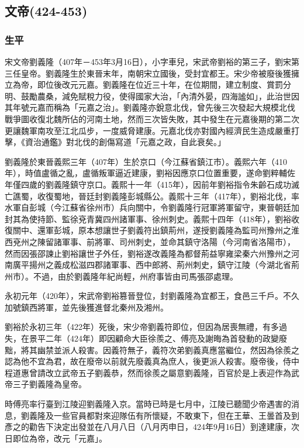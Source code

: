 
\subsection{文帝\tiny(424-453)}

\subsubsection{生平}

宋文帝劉義隆（407年－453年3月16日），小字車兒，宋武帝劉裕的第三子，劉宋第三任皇帝。劉義隆生於東晉末年，南朝宋立國後，受封宜都王。宋少帝被廢後獲擁立為帝，即位後改元元嘉。劉義隆在位近三十年，在位期間，建立制度、賞罰分明、鼓勵農桑，減免賦稅力役，使得國家大治，「內清外晏，四海謐如」，此治世因其年號元嘉而稱為「元嘉之治」。劉義隆亦銳意北伐，曾先後三次發起大規模北伐戰爭圖收復北魏所佔的河南土地，然而三次皆失敗，其中發生在元嘉後期的第二次更讓魏軍南攻至江北瓜步，一度威脅建康。元嘉北伐亦對國內經濟民生造成嚴重打擊，《資治通鑑》對北伐的創傷寫道「元嘉之政，自此衰矣。」

劉義隆於東晉義熙三年（407年）生於京口（今江蘇省鎮江市）。義熙六年（410年），時值盧循之亂，盧循叛軍逼近建康，劉裕因應京口位置重要，遂命劉粹輔佐年僅四歲的劉義隆鎮守京口。義熙十一年（415年），因前年劉裕指令朱齡石成功滅亡譙蜀，收復蜀地，晉廷封劉義隆彭城縣公。義熙十三年（417年），劉裕北伐，率水軍自彭城（今江蘇省徐州市）兵向關中，令劉義隆行冠軍將軍留守，東晉朝廷加封其為使持節、監徐兗青冀四州諸軍事、徐州刺史。義熙十四年（418年），劉裕收復關中、還軍彭城，原本想讓世子劉義符出鎮荊州，遂授劉義隆為監司州豫州之淮西兗州之陳留諸軍事、前將軍、司州刺史，並命其鎮守洛陽（今河南省洛陽市），然而因張邵諫止劉裕讓世子外任，劉裕遂改義隆為都督荊益寧雍梁秦六州豫州之河南廣平揚州之義成松滋四郡諸軍事、西中郎將、荊州刺史，鎮守江陵（今湖北省荊州市）。不過，由於劉義隆年紀尚輕，州府事皆由司馬張邵處理。

永初元年（420年），宋武帝劉裕篡晉登位，封劉義隆為宜都王，食邑三千戶。不久加號鎮西將軍，並先後獲進督北秦州及湘州。

劉裕於永初三年（422年）死後，宋少帝劉義符即位，但因為居喪無禮，有多過失，在景平二年（424年）即因顧命大臣徐羨之、傅亮及謝晦為首發動的政變廢黜，將其幽禁並派人殺害。因義符無子，義符次弟劉義真應當繼位，然因為徐羨之認為他不宜為君，故在廢帝以前就先廢義真為庶人，後更派人殺害。廢帝後，侍中程道惠曾請改立武帝五子劉義恭，然而徐羨之屬意劉義隆，百官於是上表迎作為武帝三子劉義隆為皇帝。

時傅亮率行臺到江陵迎劉義隆入京。當時已時是七月中，江陵已聽聞少帝遇害的消息，劉義隆及一些官員都對來迎隊伍有所懷疑，不敢東下，但在王華、王曇首及到彥之的勸告下決定出發並在八月八日（八月丙申日，424年9月16日）到達建康，次日即位為帝，改元「元嘉」。

